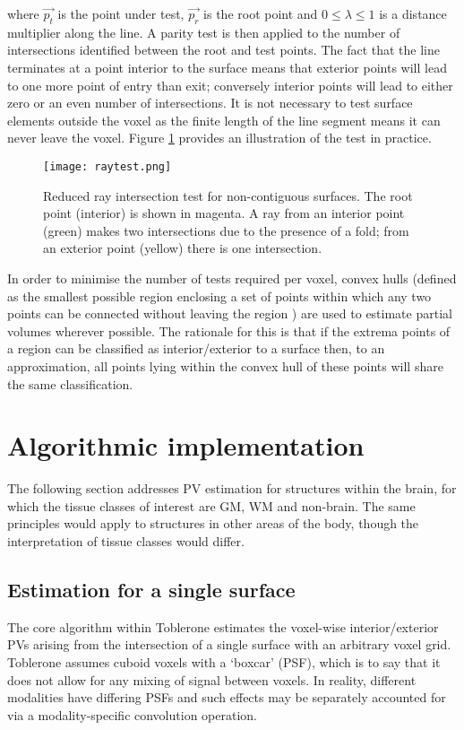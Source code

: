 where $\vec{p_t}$ is the point under test, $\vec{p_r}$ is the root point and $0 \leq \lambda \leq 1$ is a distance multiplier along the line. A parity test is then applied to the number of intersections identified between the root and test points. The fact that the line terminates at a point interior to the surface means that exterior points will lead to one more point of entry than exit; conversely interior points will lead to either zero or an even number of intersections. It is not necessary to test surface elements outside the voxel as the finite length of the line segment means it can never leave the voxel. Figure \ref{raytest} provides an illustration of the test in practice. 

\begin{figure}
\centering
\texttt{[image: raytest.png]}
\caption{Reduced ray intersection test for non-contiguous surfaces. The root point (interior) is shown in magenta. A ray from an interior point (green) makes two intersections due to the presence of a fold; from an exterior point (yellow) there is one intersection.}
\label{raytest}
\end{figure}

In order to minimise the number of tests required per voxel, convex hulls (defined as the smallest possible region enclosing a set of points within which any two points can be connected without leaving the region \cite{DeBerg2008}) are used to estimate partial volumes wherever possible. The rationale for this is that if the extrema points of a region can be classified as interior/exterior to a surface then, to an approximation, all points lying within the convex hull of these points will share the same classification. 

\section{Algorithmic implementation}

The following section addresses PV estimation for structures within the brain, for which the tissue classes of interest are GM, WM and non-brain. The same principles would apply to structures in other areas of the body, though the interpretation of tissue classes would differ. 

\subsection{Estimation for a single surface}

The core algorithm within Toblerone estimates the voxel-wise interior/exterior PVs arising from the intersection of a single surface with an arbitrary voxel grid. Toblerone assumes cuboid voxels with a ‘boxcar’ (PSF), which is to say that it does not allow for any mixing of signal between voxels. In reality, different modalities have differing PSFs and such effects may be separately accounted for via a modality-specific convolution operation. 

